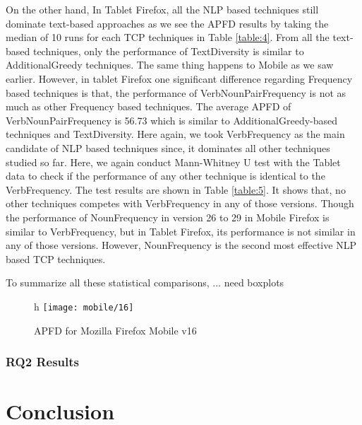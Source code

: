 \documentclass[conference]{IEEEtran}
\begin{document}
On the other hand, In Tablet Firefox, all the NLP based techniques still dominate text-based approaches as we see the APFD results by taking the median of 10 runs for each TCP techniques in Table \ref{table:4}. From all the text-based techniques, only the performance of TextDiversity is similar to AdditionalGreedy techniques. The same thing happens to Mobile as we saw earlier. However, in tablet Firefox one significant difference regarding Frequency based techniques is that, the performance of VerbNounPairFrequency is not as much as other Frequency based techniques. The average APFD of VerbNounPairFrequency is 56.73 which is similar to AdditionalGreedy-based techniques and TextDiversity. Here again, we took VerbFrequency as the main candidate of NLP based techniques since, it dominates all other techniques studied so far. Here, we again conduct Mann-Whitney U test with the Tablet data to check if the performance of any other technique is identical to the VerbFrequency. The test results are shown in Table \ref{table:5}. It shows that, no other techniques competes with VerbFrequency in any of those versions. Though the performance of NounFrequency in version 26 to 29 in Mobile Firefox is similar to VerbFrequency, but in Tablet Firefox, its performance is not similar in any of those versions. However, NounFrequency is the second most effective NLP based TCP techniques. 

To summarize all these statistical comparisons, ... need boxplots


\begin{figure*}{h}
  \texttt{[image: mobile/16]}
  \caption{APFD for Mozilla Firefox Mobile v16}\label{fig:16}
\end{figure*}




\subsubsection{RQ2 Results}



\section{Conclusion}
\blindtext





\end{document}
